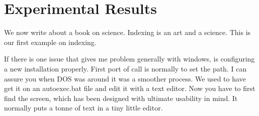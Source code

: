 \documentclass{book}
\begin{document}
\chapter{Experimental Results}
We now write about a book on science. Indexing is an
art and a science. This is our first example on indexing.



If there is one issue that gives me problem generally with windows, is
configuring a new installation properly. First port of call is normally
to set the path. I can assure you when DOS was around it was a smoother
process. We used to have get it on an autoexec.bat file and edit it with
a text editor. Now you have to first find the screen, which has been designed
with ultimate usability in mind. It normally puts a tonne of text in a tiny
little editor.



























\printindex
\end{document}
